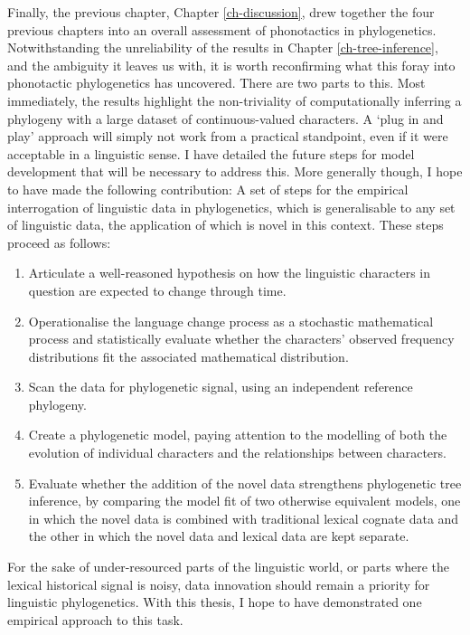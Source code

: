 Finally, the previous chapter, Chapter \ref{ch-discussion}, drew together the four previous chapters into an overall assessment of phonotactics in phylogenetics. Notwithstanding the unreliability of the results in Chapter \ref{ch-tree-inference}, and the ambiguity it leaves us with, it is worth reconfirming what this foray into phonotactic phylogenetics has uncovered. There are two parts to this. Most immediately, the results highlight the non-triviality of computationally inferring a phylogeny with a large dataset of continuous-valued characters. A `plug in and play' approach will simply not work from a practical standpoint, even if it were acceptable in a linguistic sense. I have detailed the future steps for model development that will be necessary to address this. More generally though, I hope to have made the following contribution: A set of steps for the empirical interrogation of linguistic data in phylogenetics, which is generalisable to any set of linguistic data, the application of which is novel in this context. These steps proceed as follows:

\begin{enumerate}
\def\labelenumi{(\arabic{enumi})}
\tightlist
\item
  Articulate a well-reasoned hypothesis on how the linguistic characters in question are expected to change through time.
\item
  Operationalise the language change process as a stochastic mathematical process and statistically evaluate whether the characters' observed frequency distributions fit the associated mathematical distribution.
\item
  Scan the data for phylogenetic signal, using an independent reference phylogeny.
\item
  Create a phylogenetic model, paying attention to the modelling of both the evolution of individual characters and the relationships between characters.
\item
  Evaluate whether the addition of the novel data strengthens phylogenetic tree inference, by comparing the model fit of two otherwise equivalent models, one in which the novel data is combined with traditional lexical cognate data and the other in which the novel data and lexical data are kept separate.
\end{enumerate}

For the sake of under-resourced parts of the linguistic world, or parts where the lexical historical signal is noisy, data innovation should remain a priority for linguistic phylogenetics. With this thesis, I hope to have demonstrated one empirical approach to this task.

